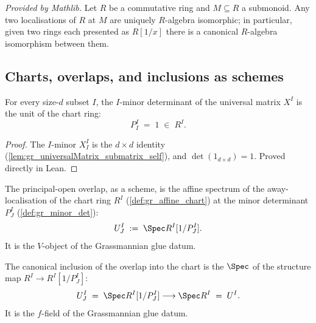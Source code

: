 \begin{lemma}
  \label{lem:mathlib_isLocalization_algEquiv}
  \mathlibok
  \textit{Provided by Mathlib.}
  Let \(R\) be a commutative ring and \(M \subseteq R\) a submonoid. Any two
  localisations of \(R\) at \(M\) are uniquely \(R\)-algebra isomorphic; in
  particular, given two rings each presented as \(R[1/x]\) there is a canonical
  \(R\)-algebra isomorphism between them.
\end{lemma}

\subsection*{Charts, overlaps, and inclusions as schemes}

\begin{theorem}\leanok
  \label{lem:gr_minorDet_self}
  For every size-\(d\) subset \(I\), the \(I\)-minor determinant of the universal
  matrix \(X^I\) is the unit of the chart ring:
  \[
    P^I_I \;=\; 1 \;\in\; R^I.
  \]
\end{theorem}
\begin{proof}
  \leanok
  The \(I\)-minor \(X^I_I\) is the \(d \times d\) identity
  (\cref{lem:gr_universalMatrix_submatrix_self}), and \(\det(1_{d\times d}) = 1\).
  Proved directly in Lean.
\end{proof}

\begin{definition}\leanok
  \label{def:gr_chart_overlap}
  The principal-open overlap, as a scheme, is the affine spectrum of the
  away-localisation of the chart ring \(R^I\) (\cref{def:gr_affine_chart}) at the
  minor determinant \(P^I_J\) (\cref{def:gr_minor_det}):
  \[
    U^I_J \;:=\; \Spec R^I[1/P^I_J].
  \]
  It is the \(V\)-object of the Grassmannian glue datum.
\end{definition}

\begin{definition}\leanok
  \label{def:gr_chart_incl}
  The canonical inclusion of the overlap into the chart is the \(\Spec\) of the
  structure map \(R^I \to R^I[1/P^I_J]\):
  \[
    U^I_J \;=\; \Spec R^I[1/P^I_J] \longrightarrow \Spec R^I \;=\; U^I .
  \]
  It is the \(f\)-field of the Grassmannian glue datum.
\end{definition}

